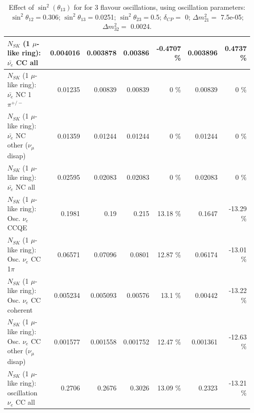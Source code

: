 \begin{table}
\begin{tabular}{| l | r | r | r  r | r  r |}
                            $N_{SK}$ (1 $\mu$-like ring): $\bar{\nu_{e}}$ CC all &        0.004016 &        0.003878 &         0.00386 &  -0.4707 \%  &        0.003896 &   0.4737 \%  \\ 
\hline
                     $N_{SK}$ (1 $\mu$-like ring): $\bar{\nu_e}$ NC 1$\pi^{+/-}$ &         0.01235 &         0.00839 &         0.00839 &        0 \%  &         0.00839 &        0 \%  \\ 
          $N_{SK}$ (1 $\mu$-like ring): $\bar{\nu_e}$ NC other ($\nu_\mu$ disap) &         0.01359 &         0.01244 &         0.01244 &        0 \%  &         0.01244 &        0 \%  \\ 
                            $N_{SK}$ (1 $\mu$-like ring): $\bar{\nu_{e}}$ NC all &         0.02595 &         0.02083 &         0.02083 &        0 \%  &         0.02083 &        0 \%  \\ 
\hline
\hline
\hline
                                 $N_{SK}$ (1 $\mu$-like ring): Osc. $\nu_e$ CCQE &          0.1981 &            0.19 &           0.215 &    13.18 \%  &          0.1647 &   -13.29 \%  \\ 
                            $N_{SK}$ (1 $\mu$-like ring): Osc. $\nu_e$ CC 1$\pi$ &         0.06571 &         0.07096 &          0.0801 &    12.87 \%  &         0.06174 &   -13.01 \%  \\ 
                          $N_{SK}$ (1 $\mu$-like ring): Osc. $\nu_e$ CC coherent &        0.005234 &        0.005093 &         0.00576 &     13.1 \%  &         0.00442 &   -13.22 \%  \\ 
           $N_{SK}$ (1 $\mu$-like ring): Osc. $\nu_e$ CC other ($\nu_\mu$ disap) &        0.001577 &        0.001558 &        0.001752 &    12.47 \%  &        0.001361 &   -12.63 \%  \\ 
                        $N_{SK}$ (1 $\mu$-like ring): oscillation $\nu_e$ CC all &          0.2706 &          0.2676 &          0.3026 &    13.09 \%  &          0.2323 &   -13.21 \%  \\ 
\hline
\hline
\end{tabular}
\caption{ Effect of $\sin^2(\theta_{13})$ for for 3 flavour oscillations, using oscillation parameters:  $\sin^2\theta_{12} = $0.306; $\sin^2\theta_{13} = $0.0251; $\sin^2\theta_{23} = $0.5; $\delta_{CP} = $        0; $\Delta m^2_{21} = $    7.5e-05; $\Delta m^2_{32} = $    0.0024. }
\label{tab:num_mixing13_1RmuT_3f_osc_t13:0.0251}
\end{table}
\clearpage
